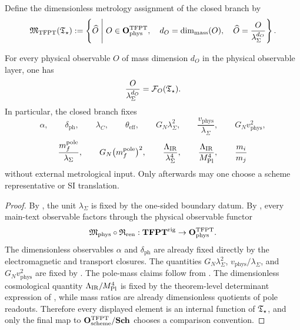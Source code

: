 \begin{definition}
\label{def:tfpt-metrology-functor}
Define the dimensionless metrology assignment of the closed branch by
\[
\mathfrak M_{\mathrm{TFPT}}(\mathfrak T_{\star})
:=
\left\{
\widehat O \;\middle|\;
O\in\mathbf O_{\mathrm{phys}}^{\mathrm{TFPT}},\quad
d_O=\dim_{\mathrm{mass}}(O),\quad
\widehat O=\frac{O}{\lambda_\Sigma^{d_O}}
\right\}.
\]
\end{definition}

\begin{theorem}
\label{thm:dimensionless-tfpt-metrology}
For every physical observable $O$ of mass dimension $d_O$ in the physical observable layer, one has
\[
\frac{O}{\lambda_\Sigma^{d_O}}
=
\mathcal F_O(\mathfrak T_{\star}).
\]
In particular, the closed branch fixes
\[
\alpha,
\qquad
\delta_{\mathrm{ph}},
\qquad
\lambda_C,
\qquad
\theta_{\mathrm{eff}},
\qquad
G_N\lambda_\Sigma^2,
\qquad
\frac{v_{\mathrm{phys}}}{\lambda_\Sigma},
\qquad
G_Nv_{\mathrm{phys}}^2,
\]
\[
\frac{m_f^{\mathrm{pole}}}{\lambda_\Sigma},
\qquad
G_N\bigl(m_f^{\mathrm{pole}}\bigr)^2,
\qquad
\frac{\Lambda_{\mathrm{IR}}}{\lambda_\Sigma^4},
\qquad
\frac{\Lambda_{\mathrm{IR}}}{M_{\mathrm{Pl}}^4},
\qquad
\frac{m_i}{m_j}
\]
without external metrological input. Only afterwards may one choose a scheme representative or SI
translation.
\end{theorem}

\begin{proof}
By , the unit $\lambda_\Sigma$ is fixed by the one-sided
boundary datum. By , every main-text observable factors through
the physical observable functor
\[
\mathfrak M_{\mathrm{phys}}\circ\mathfrak R_{\mathrm{ren}}:\mathbf{TFPT}^{\mathrm{rig}}\to\mathbf O_{\mathrm{phys}}^{\mathrm{TFPT}}.
\]
The dimensionless observables $\alpha$ and $\delta_{\mathrm{ph}}$ are already fixed directly by the
electromagnetic and transport closures. The quantities
$G_N\lambda_\Sigma^2$, $v_{\mathrm{phys}}/\lambda_\Sigma$, and
$G_Nv_{\mathrm{phys}}^2$ are fixed by
. The pole-mass
claims follow from . The dimensionless cosmological
quantity $\Lambda_{\mathrm{IR}}/M_{\mathrm{Pl}}^4$ is fixed by the theorem-level determinant expression of
, while mass ratios are already dimensionless quotients of pole
readouts. Therefore every displayed element is an internal function of $\mathfrak T_{\star}$, and only the final
map to $\mathbf O_{\mathrm{scheme}}^{\mathrm{TFPT}}/\mathbf{Sch}$ chooses a comparison convention.
\end{proof}

